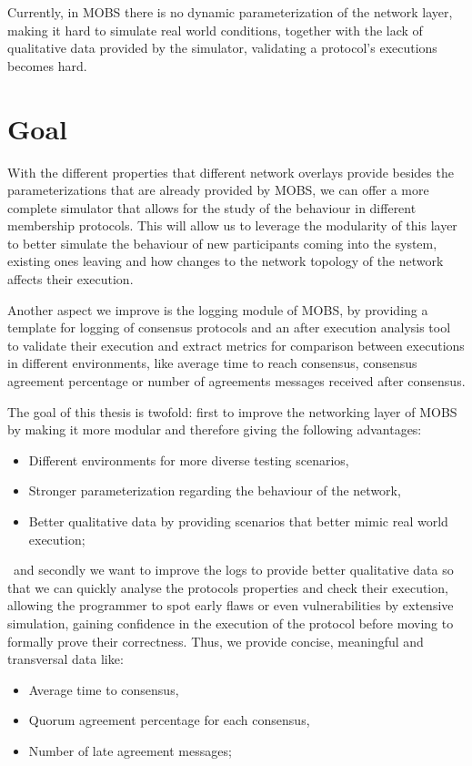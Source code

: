 Currently, in MOBS there is no dynamic parameterization of the network layer, making it hard to simulate real world conditions,
together with the lack of qualitative data provided by the simulator, validating a protocol's executions becomes hard.


\section{Goal}\label{sub:goal}

With the different properties that different network overlays provide besides the parameterizations that are already provided by MOBS,
we can offer a more complete simulator that allows for the study of the behaviour in different membership protocols.
This will allow us to leverage the modularity of this layer to better simulate the behaviour of new participants coming into the system, existing
ones leaving and how changes to the network topology of the network affects their execution.

Another aspect we improve is the logging module of MOBS, by providing a template for logging of consensus protocols and
an after execution analysis tool to validate their execution and extract metrics for
comparison between executions in different environments, like average time to reach consensus, consensus agreement percentage or
number of agreements messages received after consensus.


The goal of this thesis is twofold: first to improve the networking layer of MOBS by making it more modular and therefore giving the following advantages:
\begin{itemize}
  \item Different environments for more diverse testing scenarios,
  \item Stronger parameterization regarding the behaviour of the network,
  \item Better qualitative data by providing scenarios that better mimic real world execution;
\end{itemize}

\noindent~and secondly we want to improve the logs to provide better qualitative data so that we can quickly analyse the
protocols properties and check their execution, allowing the programmer to spot early flaws or even vulnerabilities
by extensive simulation, gaining confidence in the execution of the protocol before moving to formally prove their correctness. 
Thus, we provide concise, meaningful and transversal data like:
\begin{itemize}
  \item Average time to consensus,
  \item Quorum agreement percentage for each consensus,
  \item Number of late agreement messages;
\end{itemize}

